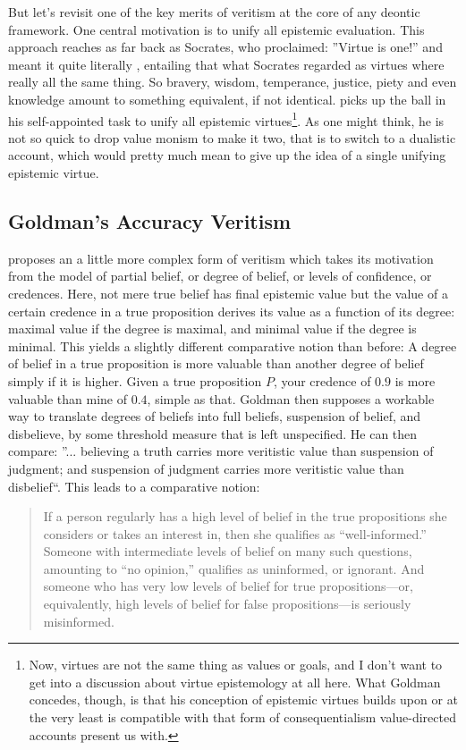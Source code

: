 \documentclass[12pt,numbers=noenddot]{scrartcl}
\begin{document}
But let's revisit one of the key merits of veritism at the core of any deontic framework. One central motivation is to unify all epistemic evaluation. This approach reaches as far back as Socrates, who proclaimed: ”Virtue is one!” and meant it quite literally \parencite{penner1973}, entailing that what Socrates regarded as virtues where really all the same thing. So bravery, wisdom, temperance, justice, piety and even knowledge amount to something equivalent, if not identical.
\textcite{Goldman2002-GOLTUO-2} picks up the ball in his self-appointed task to unify all epistemic virtues\footnote{Now, virtues are not the same thing as values or goals, and I don't want to get into a discussion about virtue epistemology at all here. What Goldman concedes, though, is that his conception of epistemic virtues builds upon or at the very least is compatible with that form of consequentialism value-directed accounts present us with.}. As one might think, he is not so quick to drop value monism to make it two, that is to switch to a dualistic account, which would pretty much mean to give up the idea of a single unifying epistemic virtue.

\subsection{Goldman's Accuracy Veritism}
\textcite[58]{Goldman2002-GOLTUO-2} proposes an a little more complex form of veritism which takes its motivation from the model of partial belief, or degree of belief, or levels of confidence, or credences. Here, not mere true belief has final epistemic value but the value of a certain credence in a true proposition derives its value as a function of its degree: maximal value if the degree is maximal, and minimal value if the degree is minimal. This yields a slightly different comparative notion than before: A degree of belief in a true proposition is more valuable than another degree of belief simply if it is higher. Given a true proposition $P$, your credence of $0.9$ is more valuable than mine of $0.4$, simple as that.
Goldman then supposes a workable way to translate degrees of beliefs into full beliefs, suspension of belief, and disbelieve, by some threshold measure that is left unspecified. He can then compare: ”... believing a truth carries more veritistic value than suspension of judgment; and suspension of judgment carries more veritistic value than disbelief“. This leads to a comparative notion:

\begin{quote}
    If a person regularly has a high level of belief in the true propositions she considers or takes an interest in, then she qualifies as “well‐informed.” Someone with intermediate levels of belief on many such questions, amounting to “no opinion,” qualifies as uninformed, or ignorant. And someone who has very low levels of belief for true propositions—or, equivalently, high levels of belief for false propositions—is seriously misinformed. \parencite[12]{Goldman2002-GOLTUO-2}
\end{quote}
\end{document}

